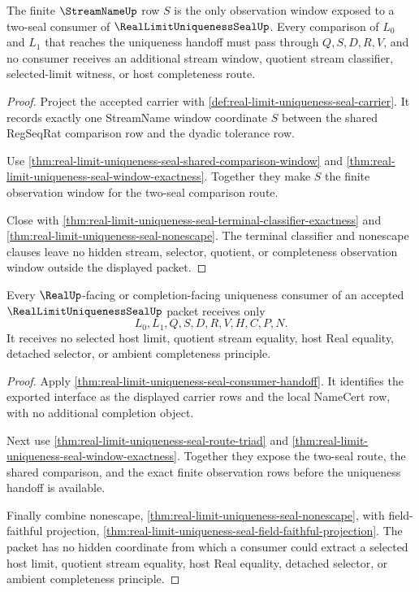 \begin{theorem}
\label{thm:real-limit-uniqueness-seal-streamname-window-totality}
The finite $\StreamNameUp$ row $S$ is the only observation window exposed to a two-seal consumer of $\RealLimitUniquenessSealUp$. Every comparison of $L_0$ and $L_1$ that reaches the uniqueness handoff must pass through $Q,S,D,R,V$, and no consumer receives an additional stream window, quotient stream classifier, selected-limit witness, or host completeness route.
\end{theorem}
\begin{proof}
Project the accepted carrier with \autoref{def:real-limit-uniqueness-seal-carrier}. It records exactly one StreamName window coordinate $S$ between the shared RegSeqRat comparison row and the dyadic tolerance row.

Use \autoref{thm:real-limit-uniqueness-seal-shared-comparison-window} and \autoref{thm:real-limit-uniqueness-seal-window-exactness}. Together they make $S$ the finite observation window for the two-seal comparison route.

Close with \autoref{thm:real-limit-uniqueness-seal-terminal-classifier-exactness} and \autoref{thm:real-limit-uniqueness-seal-nonescape}. The terminal classifier and nonescape clauses leave no hidden stream, selector, quotient, or completeness observation window outside the displayed packet.
\end{proof}

\begin{theorem}
\label{thm:real-limit-uniqueness-seal-consumer-exhaustion}
Every $\RealUp$-facing or completion-facing uniqueness consumer of an accepted $\RealLimitUniquenessSealUp$ packet receives only
$$
L_0,L_1,Q,S,D,R,V,H,C,P,N .
$$
It receives no selected host limit, quotient stream equality, host Real equality, detached selector, or ambient completeness principle.
\end{theorem}
\begin{proof}
Apply \autoref{thm:real-limit-uniqueness-seal-consumer-handoff}. It identifies the exported interface as the displayed carrier rows and the local NameCert row, with no additional completion object.

Next use \autoref{thm:real-limit-uniqueness-seal-route-triad} and \autoref{thm:real-limit-uniqueness-seal-window-exactness}. Together they expose the two-seal route, the shared comparison, and the exact finite observation rows before the uniqueness handoff is available.

Finally combine nonescape, \autoref{thm:real-limit-uniqueness-seal-nonescape}, with field-faithful projection, \autoref{thm:real-limit-uniqueness-seal-field-faithful-projection}. The packet has no hidden coordinate from which a consumer could extract a selected host limit, quotient stream equality, host Real equality, detached selector, or ambient completeness principle.
\end{proof}

